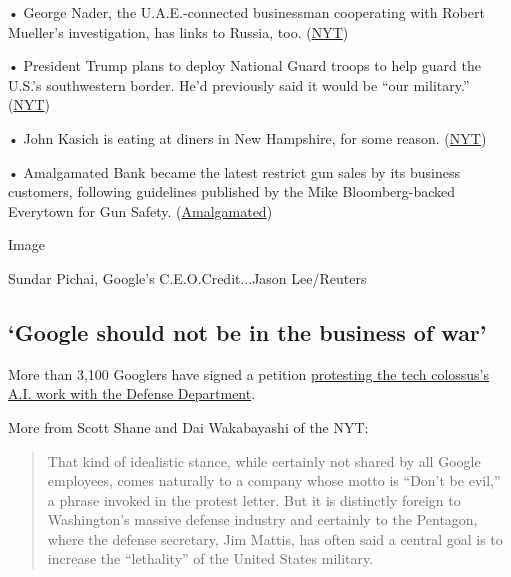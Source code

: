 • George Nader, the U.A.E.-connected businessman cooperating with Robert
Mueller's investigation, has links to Russia, too.
(\href{https://www.nytimes3xbfgragh.onion/2018/04/04/us/politics/george-nader-russia-uae-special-counsel-investigation.html?dlbk}{NYT})

• President Trump plans to deploy National Guard troops to help guard
the U.S.'s southwestern border. He'd previously said it would be ``our
military.''
(\href{https://www.nytimes3xbfgragh.onion/2018/04/04/us/politics/trump-governors-national-guard-border-mexico.html?dlbk}{NYT})

• John Kasich is eating at diners in New Hampshire, for some reason.
(\href{https://www.nytimes3xbfgragh.onion/2018/04/04/us/politics/john-kasich-trump-new-hampshire.html?dlbk}{NYT})

• Amalgamated Bank became the latest restrict gun sales by its business
customers, following guidelines published by the Mike Bloomberg-backed
Everytown for Gun Safety.
(\href{https://www.amalgamatedbank.com/news/amalgamated-bank-adopts-additional-policies-promote-gun-safety?dlbk}{Amalgamated})

Image

Sundar Pichai, Google's C.E.O.Credit...Jason Lee/Reuters

\hypertarget{google-should-not-be-in-the-business-of-war}{%
\subsection{`Google should not be in the business of
war'}\label{google-should-not-be-in-the-business-of-war}}

More than 3,100 Googlers have signed a petition
\href{https://www.nytimes3xbfgragh.onion/2018/04/04/technology/google-letter-ceo-pentagon-project.html?dlbk}{protesting
the tech colossus's A.I. work with the Defense Department}.

More from Scott Shane and Dai Wakabayashi of the NYT:

\begin{quote}
That kind of idealistic stance, while certainly not shared by all Google
employees, comes naturally to a company whose motto is ``Don't be
evil,'' a phrase invoked in the protest letter. But it is distinctly
foreign to Washington's massive defense industry and certainly to the
Pentagon, where the defense secretary, Jim Mattis, has often said a
central goal is to increase the ``lethality'' of the United States
military.
\end{quote}

